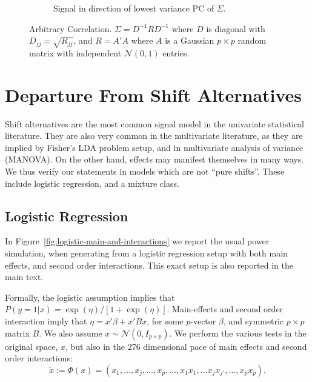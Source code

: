 \documentclass[]{bio}
\begin{document}
\begin{figure}[h]
\begin{subfigure}[t]{.45\columnwidth}
		\caption{Signal in direction of lowest variance PC of $\Sigma$.} 
		\label{fig:dependence_32}
	\end{subfigure}
	\caption{Arbitrary Correlation. 
		$\Sigma=D^{-1} R D^{-1}$ where $D$ is diagonal with $D_{jj}=\sqrt{R_{jj}}$, and $R=A'A$ where $A$ is a Gaussian $p\times p$ random matrix with independent $\mathcal{N}(0,1)$ entries.
	}
	\label{fig:dependence_3}
\end{figure}






\section{Departure From Shift Alternatives}

Shift alternatives are the most common signal model in the univariate statistical literature. 
They are also very common in the multivariate literature, as they are implied by Fisher's LDA problem setup, and in multivariate analysis of variance (MANOVA).
On the other hand, effects may manifest themselves in many ways. 
We thus verify our statements in models which are not ``pure shifts''. 
These include logistic regression, and a mixture class. 


\subsection{Logistic Regression}

In Figure~\ref{fig:logistic-main-and-interactions} we report the usual power simulation, when generating from a logistic regression setup with both main effects, and second order interactions.
This exact setup is also reported in the main text.

Formally, the logistic assumption implies that 
$P(y=1|x)=\exp(\eta)/[1+\exp(\eta)]$.
Main-effects and second order interaction imply that 
$\eta=x'\beta+x'Bx$, for some $p$-vector $\beta$, and symmetric $p \times p$ matrix $B$.
We also assume $x\sim \mathcal{N}(0,I_{p\times p})$.
We perform the various tests in the original space, $x$, but also in the $276$ dimensional pace of main effects and second order interactions: 
$$\tilde{x}:=\Phi(x)=(x_1,\dots,x_j,\dots,x_p,\dots,x_1x_1,\dots x_jx_{j'},\dots,x_p x_p).$$
\end{document}
